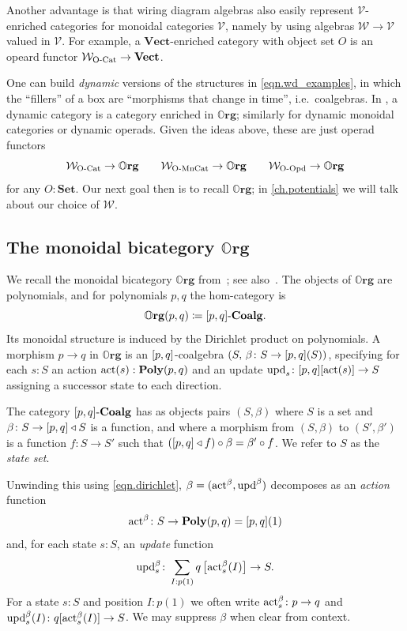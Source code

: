 \documentclass[11pt, oneside, article]{memoir}
\theoremstyle{definition}
\theoremstyle{plain}
\newenvironment{definition}
  {\pushQED{\qed}\renewcommand{\qedsymbol}{$\lozenge$}\definitionx}
  {\popQED\enddefinitionx}
\DeclarePairedDelimiter{\ihom}{[}{]}
\newcommand{\cat}[1]{\mathcal{#1}}%
\newcommand{\Cat}[1]{\mathbf{#1}}%
\newcommand{\tn}[1]{\textnormal{#1}}
\newcommand{\smset}{\Cat{Set}}
\newcommand{\vect}{\Cat{Vect}}
\newcommand{\act}{\tn{act}}
\newcommand{\upd}{\tn{upd}}
\newcommand{\poly}{\Cat{Poly}}
\newcommand{\tri}{\mathbin{\triangleleft}}
\newcommand{\coalg}{\tn{-}\Cat{Coalg}}
\newcommand{\org}{{\mathbb{O}\Cat{rg}}}
\begin{document}
Another advantage is that wiring diagram algebras also easily represent $\cat{V}$-enriched categories for monoidal categories $\cat{V}$, namely by using algebras $\cat{W}\to\cat{V}$ valued in $\cat{V}$. For example, a $\vect$-enriched category with object set $O$ is an opeard functor $\cat{W}_{\tn{O-Cat}}\to\vect$.


One can build \emph{dynamic} versions of the structures in \eqref{eqn.wd_examples}, in which the ``fillers'' of a box are ``morphisms that change in time'', i.e.\ coalgebras.  In \cite{shapiro2022dynamic}, a dynamic category is a category enriched in $\org$; similarly for dynamic monoidal categories or dynamic operads. Given the ideas above, these are just operad functors
\[
\cat{W}_{\tn{O-Cat}}\to\org
\qquad
\cat{W}_{\tn{O-MnCat}}\to\org
\qquad
\cat{W}_{\tn{O-Opd}}\to\org
\] 
for any $O:\smset$. Our next goal then is to recall $\org$; in \cref{ch.potentials} we will talk about our choice of $\cat{W}$.

\subsection{The monoidal bicategory $\org$}\label{sec.org}

We recall the monoidal bicategory $\org$ from~\cite{spivak2021learners}; see also~\cite{shapiro2022dynamic}. The objects of $\org$ are polynomials, and for polynomials $p,q$ the hom-category is
\[\org(p,q)\coloneqq\ihom{p,q}\tn{-}\Cat{Coalg}.\]
Its monoidal structure is induced by the Dirichlet product on polynomials. A morphism $p\to q$ in $\org$ is an $\ihom{p,q}$-coalgebra $(S,\,\beta\colon S\to\ihom{p,q}(S))$, specifying for each $s:S$ an action $\act(s):\poly(p,q)$ and an update $\upd_s\colon\ihom{p,q}[\act(s)]\to S$ assigning a successor state to each direction.

\begin{definition}\label{def.pq_coalg}
The category $\ihom{p,q}\coalg$ has as objects pairs $(S,\beta)$ where $S$ is a set and $\beta\colon S\to\ihom{p,q}\tri S$ is a function, and where a morphism from $(S,\beta)$ to $(S',\beta')$ is a function $f\colon S\to S'$ such that $(\ihom{p,q}\tri f)\circ\beta=\beta'\circ f$. We refer to $S$ as the \emph{state set}.
\end{definition}

Unwinding this using \eqref{eqn.dirichlet}, $\beta=(\act^\beta,\upd^\beta)$ decomposes as an \emph{action} function
\[\act^\beta\colon S\to\poly(p,q)=\ihom{p,q}(1)\]
and, for each state $s:S$, an \emph{update} function
\[\upd^\beta_s\colon\sum_{I:p(1)}q\left[\act^\beta_s(I)\right]\to S.\]
For a state $s:S$ and position $I:p(1)$ we often write $\act^\beta_s\colon p\to q$ and $\upd^\beta_s(I)\colon q[\act^\beta_s(I)]\to S$. We may suppress $\beta$ when clear from context.
\end{document}
